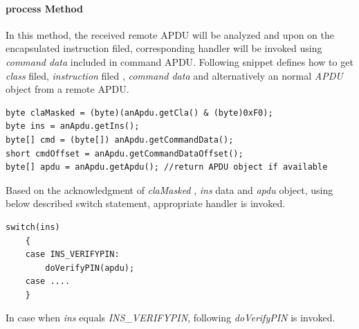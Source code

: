 \paragraph{process Method}
In this method, the received remote APDU will be analyzed and upon on the encapsulated instruction filed, corresponding handler will be invoked using \emph{command data} included in command APDU. Following snippet defines how to get \emph{class} filed, \emph{instruction} filed , \emph{command data} and alternatively an normal \emph{APDU} object from a remote APDU.


\begin{Verbatim}[frame=lines,framesep=4mm, label=\fbox{\small\emph{Remote APDU Operation}}]
byte claMasked = (byte)(anApdu.getCla() & (byte)0xF0);
byte ins = anApdu.getIns();
byte[] cmd = (byte[]) anApdu.getCommandData();	    
short cmdOffset = anApdu.getCommandDataOffset();
byte[] apdu = anApdu.getApdu(); //return APDU object if available
\end{Verbatim}

Based on the acknowledgment of \emph{claMasked} , \emph{ins} data and \emph{apdu} object, using below described switch statement, appropriate handler is invoked.

\begin{Verbatim}[frame=lines,framesep=4mm, label=\fbox{\small\emph{Switch Statement}}]
switch(ins)
	{
	case INS_VERIFYPIN:
		doVerifyPIN(apdu);
	case ....
	}
\end{Verbatim}
In case when \emph{ins} equals \emph{INS\_VERIFYPIN}, following \emph{doVerifyPIN} is invoked.

